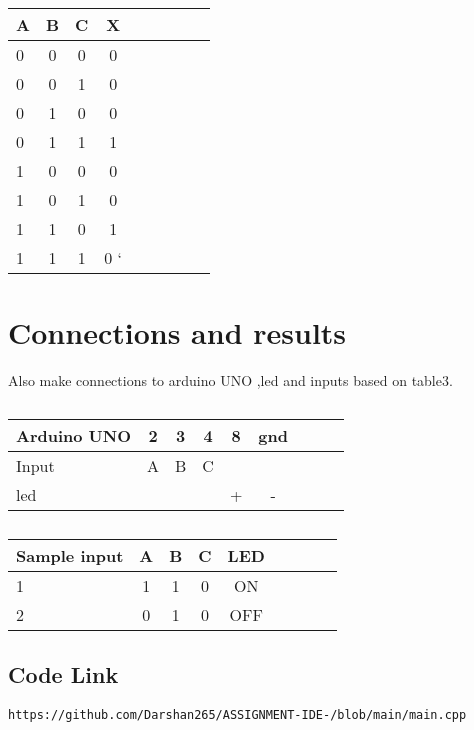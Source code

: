 \documentclass[10pt, a4paper]{article}
\begin{document}
\begin{table}[htbp]
 \begin{center}
    \begin{tabular}{|l|c|c|c|c|c|c|c|c} \hline \textbf{A}
  & \textbf{B} & \textbf{C} & \textbf{X} \\
 \hline
        0&0&0&0 \\
        \hline
        0&0&1&0 \\
        \hline
        0&1&0&0 \\
        \hline
        0&1&1&1 \\
        \hline
        1&0&0&0 \\
        \hline
        1&0&1&0 \\
        \hline
        1&1&0&1 \\
        \hline
        1&1&1&0 ` \\
        \hline
        
        
\end{tabular}   
\end{center}
\caption{\label{table:dummytable} }
\end{table}
\section{Connections and results}
Also make connections to arduino UNO ,led and inputs based on table3. 

\begin{table}[htbp]
 \begin{center}
    \begin{tabular}{|l|c|c|c|c|c|c|c|c} \hline \textbf{Arduino UNO}
  & \textbf{2} & \textbf{3} & \textbf{4}& \textbf{8}& \textbf{gnd} \\
 \hline
Input&A&B&C&&\\ \hline
led&&&&+&- \\ \hline
\end{tabular}   
\end{center}
\caption{\label{table:dummytable} }
\end{table}


\begin{table}[htbp]
 \begin{center}
    \begin{tabular}{|l|c|c|c|c|c|c|c|c} \hline \textbf{Sample input}
  & \textbf{A} & \textbf{B} & \textbf{C}& \textbf{LED } \\
 \hline
1&1&1&0&ON\\ \hline
2&0&1&0&OFF \\ \hline
\end{tabular}   
\end{center}
\caption{\label{table:dummytable} }
\end{table}

\subsection{Code Link}
\vspace{5mm}
\begin{lstlisting}
https://github.com/Darshan265/ASSIGNMENT-IDE-/blob/main/main.cpp
\end{lstlisting}
\end{document}
